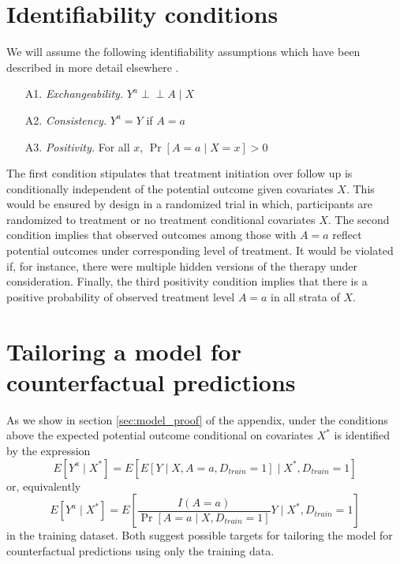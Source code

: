 \section{Identifiability conditions} \label{sec:identifiability}
We will assume the following identifiability assumptions which have been described in more detail elsewhere \cite{hernan_causal_2020,robins_new_1986,robins_graphical_1987}.

\begin{enumerate}
    \item[A1.] \textit{Exchangeability.} $Y^a \perp\!\!\!\perp A \mid X$ 
    \item[A2.] \textit{Consistency.} $Y^a = Y$ if $A = a$
    \item[A3.] \textit{Positivity.} For all $x$, $\Pr[A = a \mid X = x] > 0$ 
\end{enumerate}

The first condition stipulates that treatment initiation over follow up is conditionally independent of the potential outcome given covariates $X$. This would be ensured by design in a randomized trial in which, participants are randomized to treatment or no treatment conditional covariates $X$. The second condition implies that observed outcomes among those with $A = a$ reflect potential outcomes under corresponding level of treatment. It would be violated if, for instance, there were multiple hidden versions of the therapy under consideration. Finally, the third positivity condition implies that there is a positive probability of observed treatment level $A = a$ in all strata of $X$.  

\section{Tailoring a model for counterfactual predictions} \label{sec:model}

As we show in section \ref{sec:model_proof} of the appendix, under the conditions above the expected potential outcome conditional on covariates $X^*$ is identified by the expression
\begin{equation}\label{eqn:estimand1}
    E[Y^a \mid X^*] = E[E[Y \mid X, A = a, D_{train} = 1] \mid X^*, D_{train} = 1]
\end{equation}
or, equivalently 
\begin{equation}\label{eqn:estimand2}
    E[Y^a \mid X^*] = E\left[\frac{I(A = a)}{\Pr[A = a \mid X, D_{train} = 1]} Y \mid X^*, D_{train} = 1\right]
\end{equation}
in the training dataset. Both suggest possible targets for tailoring the model for counterfactual predictions using only the training data. 


